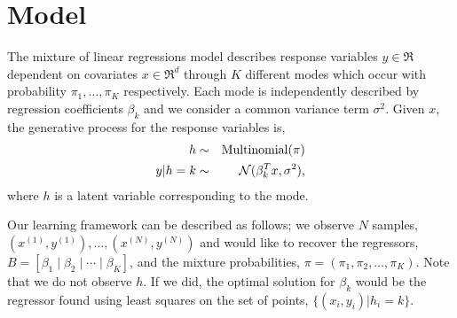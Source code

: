 \section{Model}
\label{sec:model}

\newcommand{\xn}[1]{x^{(#1)}}
\newcommand{\xni}{\xn{i}}
\newcommand{\yn}[1]{y^{(#1)}}
\newcommand{\yni}{\yn{i}}

The mixture of linear regressions model describes response variables $y
\in \Re$ dependent on covariates $x \in \Re^d$ through $K$ different
modes which occur with probability $\pi_1, \dots, \pi_K$ respectively.
Each mode is independently described by regression coefficients
$\beta_k$ and we consider a common variance term $\sigma^2$. Given $x$,
the generative process for the response variables is,
\begin{eqnarray*}
  h &\sim& \operatorname{Multinomial}(\pi) \\
  y | h = k &\sim& \mathcal{N}( \beta_{k}^T x,  \sigma^2 ),
\end{eqnarray*}
where $h$ is a latent variable corresponding to the mode.

Our learning framework can be described as follows; we observe $N$
samples, $(\xn{1}, \yn{1}), \dots, (\xn{N}, \yn{N})$ and would like to
recover the regressors, $B = [\beta_1 \mid \beta_2 \mid \cdots \mid
\beta_K]$, and the mixture probabilities, $\pi = (\pi_1, \pi_2, \dots,
\pi_K)$. Note that we do not observe $h$. If we did, the optimal
solution for $\beta_k$ would be the regressor found using least squares
on the set of points, $\{(x_i, y_i) | h_i = k \}$.

